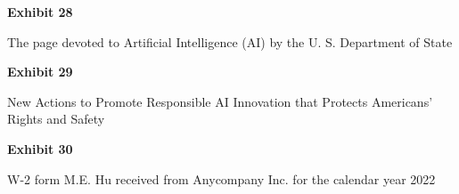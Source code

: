 \documentclass{article}
\begin{document}
% 




\vspace*{\fill}
\begin{center}

{\LARGE \bf
Exhibit 28
}

\vspace{10\baselineskip}

{\large The page devoted to Artificial Intelligence (AI) by the U. S. Department of State}

\end{center}
\vspace*{\fill}






\vspace*{\fill}
\begin{center}

{\LARGE \bf
Exhibit 29
}

\vspace{10\baselineskip}

{\large New Actions to Promote Responsible AI Innovation that Protects Americans’ Rights and Safety}

\end{center}
\vspace*{\fill}






\vspace*{\fill}
\begin{center}

{\LARGE \bf
Exhibit 30
}

\vspace{10\baselineskip}

{\large W-2 form M.E. Hu received from Anycompany Inc. for the calendar year 2022}

\end{center}
\vspace*{\fill}

% 
\end{document}
